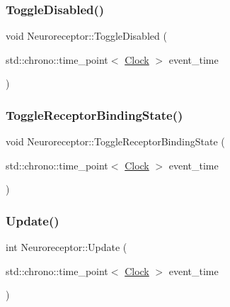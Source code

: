 \mbox{\label{classNeuroreceptor_a8a339a4d0f150bbdfbc2650155625196}} 
\subsubsection{\texorpdfstring{Toggle\+Disabled()}{ToggleDisabled()}}
{\footnotesize\ttfamily void Neuroreceptor\+::\+Toggle\+Disabled (\begin{DoxyParamCaption}\item[{std\+::chrono\+::time\+\_\+point$<$ \mbox{\hyperlink{universe_8h_a0ef8d951d1ca5ab3cfaf7ab4c7a6fd80}{Clock}} $>$}]{event\+\_\+time }\end{DoxyParamCaption})\hspace{0.3cm}{\ttfamily [inline]}}

\mbox{\label{classNeuroreceptor_ace41227d30a8f50e1a6efadc86573f80}} 
\subsubsection{\texorpdfstring{Toggle\+Receptor\+Binding\+State()}{ToggleReceptorBindingState()}}
{\footnotesize\ttfamily void Neuroreceptor\+::\+Toggle\+Receptor\+Binding\+State (\begin{DoxyParamCaption}\item[{std\+::chrono\+::time\+\_\+point$<$ \mbox{\hyperlink{universe_8h_a0ef8d951d1ca5ab3cfaf7ab4c7a6fd80}{Clock}} $>$}]{event\+\_\+time }\end{DoxyParamCaption})\hspace{0.3cm}{\ttfamily [inline]}}

\mbox{\label{classNeuroreceptor_ab8f288a095fb028793e7246a42de233b}} 
\subsubsection{\texorpdfstring{Update()}{Update()}}
{\footnotesize\ttfamily int Neuroreceptor\+::\+Update (\begin{DoxyParamCaption}\item[{std\+::chrono\+::time\+\_\+point$<$ \mbox{\hyperlink{universe_8h_a0ef8d951d1ca5ab3cfaf7ab4c7a6fd80}{Clock}} $>$}]{event\+\_\+time }\end{DoxyParamCaption})}



